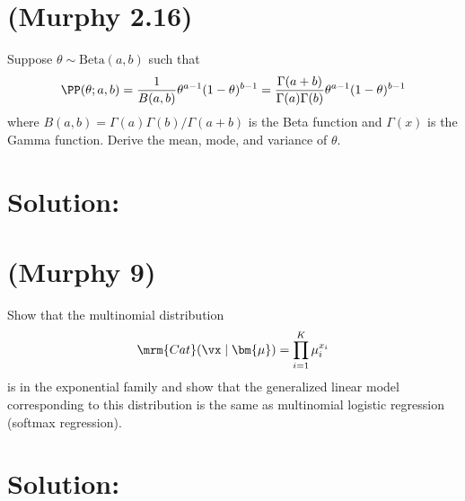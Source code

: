 \documentclass[189]{pset}
\begin{document}

  \section{(Murphy 2.16)}
    Suppose $\theta \sim \text{Beta}(a,b)$ such that
    \[
      \PP(\theta; a,b) = \frac{1}{B(a,b)} \theta^{a-1}(1-\theta)^{b-1}
      = \frac{\Gamma(a+b)}{\Gamma(a)\Gamma(b)}
      \theta^{a-1}(1-\theta)^{b-1}
    \]
    where $B(a,b) = \Gamma(a)\Gamma(b)/\Gamma(a+b)$ is the Beta
    function and $\Gamma(x)$ is the Gamma function. Derive the mean,
    mode, and variance of $\theta$.

  \hrulefill

  \section*{Solution:}

  \clearpage


  \section{(Murphy 9)}
    Show that the multinomial distribution
    \[
      \mrm{Cat}(\vx\mid\bm{\mu}) = \prod_{i=1}^K \mu_i^{x_i}
    \]
    is in the exponential family and show that the generalized linear
    model corresponding to this distribution is the same as
    multinomial logistic regression (softmax regression).

  \hrulefill

  \section*{Solution:}
\end{document}
